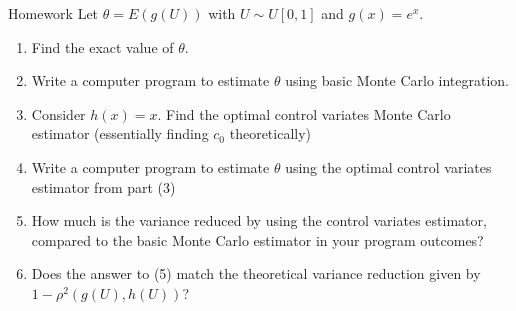 \documentclass[8pt]{beamer}
\begin{document}
\begin{frame}{Homework}
Let $\theta=E(g(U))$ with $U \sim U[0,1]$ and $g(x)=e^x$.

\vspace{2mm}

\begin{enumerate}
	\item Find the exact value of $\theta$.
	\item Write a computer program to estimate $\theta$ using basic Monte Carlo integration. 
	\item Consider $h(x)=x$. Find the optimal control variates Monte Carlo estimator (essentially finding $c_0$ theoretically)
	\item Write a computer program to estimate $\theta$ using the optimal control variates estimator from part (3)
	\item How much is the variance reduced by using the control variates estimator, compared to the basic Monte Carlo estimator in your program outcomes?
	\item Does the answer to (5) match the theoretical variance reduction given by $1-\rho^2(g(U),h(U))$?
\end{enumerate}
\end{frame}
\end{document}
